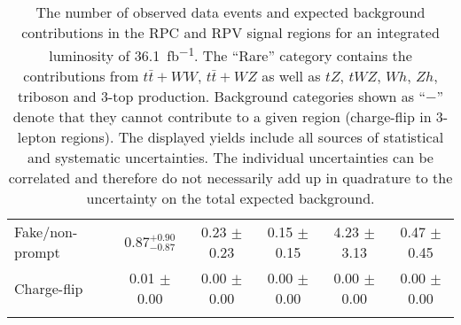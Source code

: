\begin{table}[htb!]
\begin{center}
{\begin{tabular*}{\textwidth}{@{\extracolsep{\fill}}lccccc}
        Fake/non-prompt    &    $0.87_{-0.87}^{+0.90}$    &    0.23 $\pm$ 0.23    &    0.15 $\pm$ 0.15    &   4.23 $\pm$ 3.13    &    0.47 $\pm$ 0.45    \\
        
        Charge-flip    &    0.01 $\pm$ 0.00    &    0.00 $\pm$ 0.00    &    0.00 $\pm$ 0.00    &   0.00 $\pm$ 0.00    &    0.00 $\pm$ 0.00    \\
        
\noalign{\smallskip}\hline\hline\noalign{\smallskip}
\end{tabular*}
}
    
\end{center}
\caption{The number of observed data events and expected background contributions in the RPC and RPV signal regions for an integrated 
luminosity of \SI{36.1}{fb^{-1}}. The ``Rare'' category contains the contributions from $t\bar{t}+WW$, $t\bar{t}+WZ$ as well as $tZ$, $tWZ$, $Wh$, $Zh$, 
triboson and 3-top production. Background categories shown as ``$-$'' denote that they cannot contribute to a given region (charge-flip in 3-lepton regions).
The displayed yields include all sources of statistical and systematic uncertainties. The individual uncertainties can be correlated
and therefore do not necessarily add up in quadrature to the uncertainty on the total expected background.}
\label{tab:observed_sr_yields_table1}
\end{table}
     
